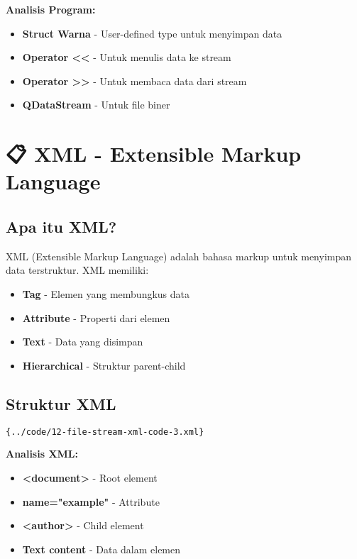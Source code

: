 \textbf{Analisis Program:}
\begin{itemize}
\item \textbf{Struct Warna} - User-defined type untuk menyimpan data
\item \textbf{Operator <<} - Untuk menulis data ke stream
\item \textbf{Operator >>} - Untuk membaca data dari stream
\item \textbf{QDataStream} - Untuk file biner
\end{itemize}

\section{📋 XML - Extensible Markup Language}

\subsection{Apa itu XML?}

XML (Extensible Markup Language) adalah bahasa markup untuk menyimpan data terstruktur. XML memiliki:

\begin{itemize}
\item \textbf{Tag} - Elemen yang membungkus data
\item \textbf{Attribute} - Properti dari elemen
\item \textbf{Text} - Data yang disimpan
\item \textbf{Hierarchical} - Struktur parent-child
\end{itemize}

\subsection{Struktur XML}

\begin{lstlisting}[language=xml]{../code/12-file-stream-xml-code-3.xml}
\end{lstlisting}

\textbf{Analisis XML:}
\begin{itemize}
\item \textbf{<document>} - Root element
\item \textbf{name="example"} - Attribute
\item \textbf{<author>} - Child element
\item \textbf{Text content} - Data dalam elemen
\end{itemize}

